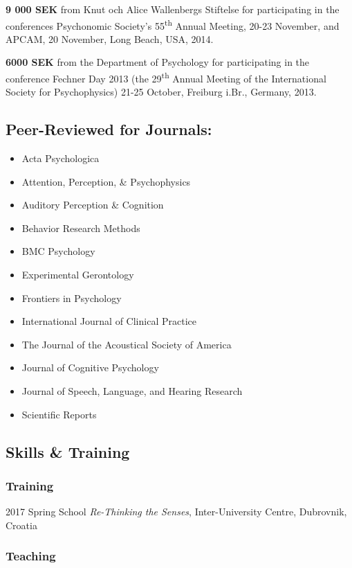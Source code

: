 \documentclass[]{article}
\begin{document}
\textbf{9 000 SEK} from Knut och Alice Wallenbergs Stiftelse for
participating in the conferences Psychonomic Society's
55\textsuperscript{th} Annual Meeting, 20-23 November, and APCAM, 20
November, Long Beach, USA, 2014.

\textbf{6000 SEK} from the Department of Psychology for participating in
the conference Fechner Day 2013 (the 29\textsuperscript{th} Annual
Meeting of the International Society for Psychophysics) 21-25 October,
Freiburg i.Br., Germany, 2013.

\subsection{Peer-Reviewed for
Journals:}\label{peer-reviewed-for-journals}

\begin{itemize}
\item
  Acta Psychologica
\item
  Attention, Perception, \& Psychophysics
\item
  Auditory Perception \& Cognition
\item
  Behavior Research Methods
\item
  BMC Psychology
\item
  Experimental Gerontology
\item
  Frontiers in Psychology
\item
  International Journal of Clinical Practice
\item
  The Journal of the Acoustical Society of America
\item
  Journal of Cognitive Psychology
\item
  Journal of Speech, Language, and Hearing Research
\item
  Scientific Reports
\end{itemize}

\subsection{Skills \& Training}\label{skills-training}

\subsubsection{Training}\label{training}

2017 Spring School \emph{Re-Thinking the Senses}, Inter-University
Centre, Dubrovnik, Croatia

\subsubsection{Teaching}\label{teaching}
\end{document}
